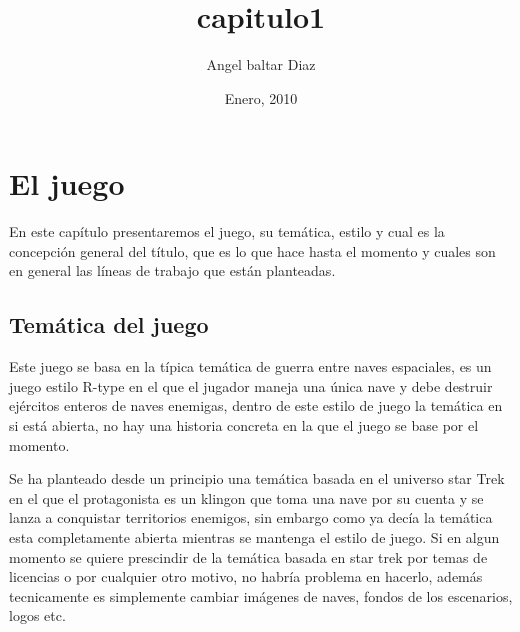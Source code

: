 


\title{capitulo1} 
\author{Angel baltar Diaz}
\date{\Large Enero, 2010} 

\chapter {El juego}
\label{capitulo1}

En este capítulo presentaremos el juego, su temática, estilo y cual es la concepción general del título, que es lo que hace hasta el momento y cuales son en general las líneas de trabajo que están planteadas.

\section{Temática del juego}

Este juego se basa en la típica temática de guerra entre naves espaciales, es un juego estilo R-type en el que el jugador maneja una única nave y debe destruir ejércitos enteros de naves enemigas, dentro de este estilo de juego la temática en si está abierta, no hay una historia concreta en la que el juego se base por el momento.

Se ha planteado desde un principio una temática basada en el universo star Trek en el que el protagonista es un klingon que toma una nave por su cuenta y se lanza a conquistar territorios enemigos, sin embargo como ya decía la temática esta completamente abierta mientras se mantenga el estilo de juego. Si en algun momento se quiere prescindir de la temática basada en star trek por temas de licencias o por cualquier otro motivo, no habría problema en hacerlo, además tecnicamente es simplemente cambiar imágenes de naves, fondos de los escenarios, logos etc. 

